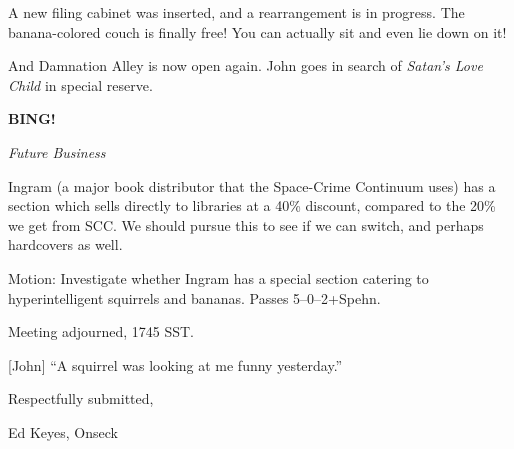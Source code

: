 \documentclass[12pt]{article}
\newcommand{\bing}{{\bf BING!} }
\newcommand{\goto}[1]{\bing \vskip 12pt \centerline{{\em{#1}}}}
\begin{document}
A new filing cabinet was inserted, and a rearrangement is in progress.
The banana-colored couch is finally free!  You can actually sit and
even lie down on it!

And Damnation Alley is now open again.  John goes in search of {\em
Satan's Love Child} in special reserve.

\goto{Future Business}

Ingram (a major book distributor that the Space-Crime Continuum uses)
has a section which sells directly to libraries at a 40\% discount,
compared to the 20\% we get from SCC.  We should pursue this to see
if we can switch, and perhaps hardcovers as well.

Motion: Investigate whether Ingram has a special section catering
to hyperintelligent squirrels and bananas.  Passes 5--0--2+Spehn.

\vspace{12pt}

\noindent
Meeting adjourned, 1745 SST.

[John] ``A squirrel was looking at me funny yesterday.''

\vspace{18pt}

\centerline{Respectfully submitted,}
\centerline{Ed Keyes, Onseck}
\end{document}
